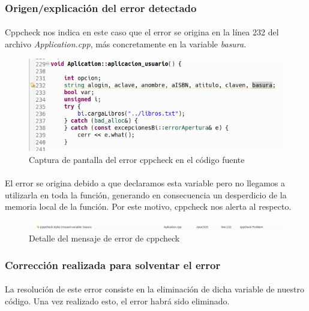 		\subsubsection{Origen/explicación del error detectado}
		
		\paragraph{}Cppcheck nos indica en este caso que el error se origina en la línea 232 del archivo \textit{Application.cpp}, más concretamente en la variable \textit{basura}.
		
		\begin{figure}[H]
			\centering
			\includegraphics[scale=0.55]{img/captura82.png}
			\caption{Captura de pantalla del error cppcheck en el código fuente}
			\label{captura82}
		\end{figure}
	
		\paragraph{}El error se origina debido a que declaramos esta variable pero no llegamos a utilizarla en toda la función, generando en consecuencia un desperdicio de la memoria local de la función. Por este motivo, cppcheck nos alerta al respecto.
	
		\begin{figure}[H]
			\centering
			\includegraphics[scale=0.38]{img/captura83.png}
			\caption{Detalle del mensaje de error de cppcheck}
			\label{captura83}
		\end{figure}
		
		\subsubsection{Corrección realizada para solventar el error}
		
		\paragraph{}La resolución de este error consiste en la eliminación de dicha variable de nuestro código. Una vez realizado esto, el error habrá sido eliminado.
		

